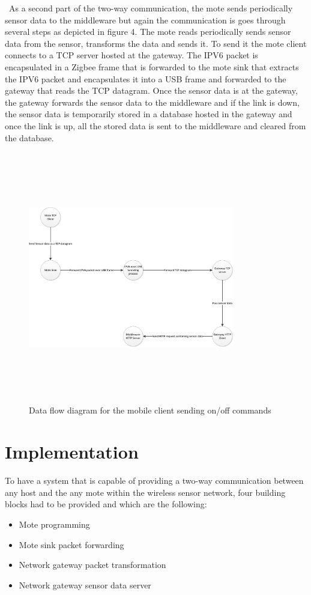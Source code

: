 \documentclass[conference]{IEEEtran}
\begin{document}
\
As a second part of the two-way communication, the mote sends periodically sensor data to the middleware but again the communication is goes through several steps as depicted in figure 4.
\linebreak 
The mote reads periodically sends sensor data from the sensor, transforms the data and sends it. To send it the mote client connects to a TCP server hosted at the gateway. The IPV6 packet is encapsulated in a Zigbee frame that is forwarded to the mote  sink that extracts the IPV6 packet and  encapsulates it into a USB frame and forwarded to the gateway that reads the TCP datagram. Once the sensor data is at the gateway, the gateway forwards the sensor data to the middleware and if the link is down, the sensor data is temporarily stored in a database hosted in the gateway and once the link is up, all the stored data is sent to the middleware and cleared from the database.



\begin{figure}[htbp]
\centering
\includegraphics[height=110mm,width=90mm]{images/send_sensor_data_data_flow.jpg}
\caption{Data flow diagram for the mobile client sending on/off commands}
\label{fig:control_appliance}
\end{figure}


\section{Implementation}
To have a system that is capable of providing a two-way communication between any host and the any mote within the wireless sensor network, four building blocks had to be provided and which are the following:
\begin{itemize}
\item Mote programming
\item Mote sink packet forwarding
\item Network gateway packet transformation
\item Network gateway sensor data server
\end{itemize}
\end{document}
